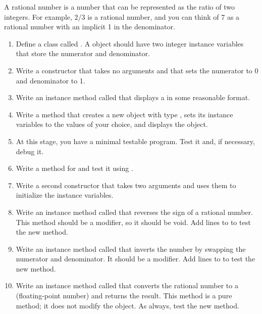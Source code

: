 \begin{exercise}  %


A rational number is a number that can be represented as the ratio of two integers.
For example, $2/3$ is a rational number, and you can think of 7 as a rational number with an implicit 1 in the denominator.

\begin{enumerate}

\item Define a class called .
A  object should have two integer instance variables that store the numerator and denominator.

\item Write a constructor that takes no arguments and that sets the numerator to 0 and denominator to 1.

\item Write an instance method called  that displays a  in some reasonable format.

\item Write a  method that creates a new object with type , sets its instance variables to the values of your choice, and displays the object.

\item At this stage, you have a minimal testable program.
Test it and, if necessary, debug it.

\item Write a  method for  and test it using .

\item Write a second constructor that takes two arguments and uses them to initialize the instance variables.

\item Write an instance method called  that reverses the sign of a rational number.
This method should be a modifier, so it should be void.
Add lines to  to test the new method.

\item Write an instance method called  that inverts the number by swapping the numerator and denominator.
It should be a modifier.
Add lines to  to test the new method.

\item Write an instance method called  that converts the rational number to a  (floating-point number) and returns the result.
This method is a pure method; it does not modify the object.
As always, test the new method.


\end{enumerate}
\end{exercise}
